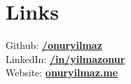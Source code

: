 \section{Links} 
\sectionspacehalf

Github: \href{https://github.com/onuryilmaz}{\bf /onuryilmaz} \\
LinkedIn: \href{https://tr.linkedin.com/in/yilmazonur}{\bf /in/yilmazonur} \\
Website: \href{https://onuryilmaz.me}{\bf onuryilmaz.me}

\sectionspacehalf
